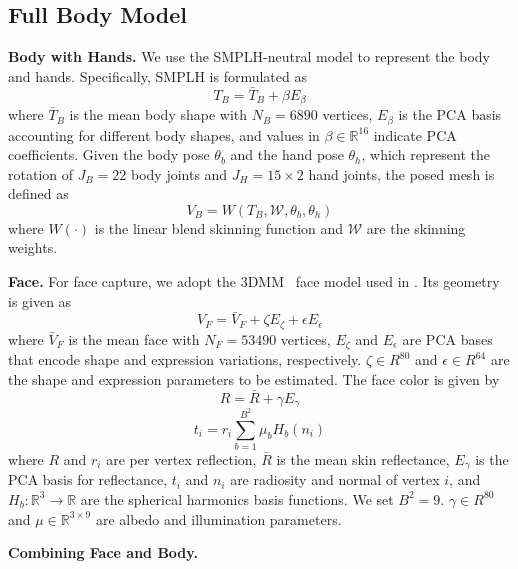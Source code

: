 \documentclass[final]{cvpr}
\begin{document}
\subsection{Full Body Model}
\label{sec:mesh}
\noindent \textbf{Body with Hands.}
We use the SMPLH-neutral \cite{romero2017embodied} model to represent the body and hands.
Specifically, SMPLH is formulated as
\begin{equation}
  T_B = \bar{T}_B + \beta E_\beta
\end{equation}
where $\bar{T}_B$ is the mean body shape with $N_B = 6890$ vertices, $E_\beta$ is the PCA basis accounting for different body shapes, and values in $\beta \in \mathbb{R}^{16}$ indicate PCA coefficients.
Given the body pose $\theta_b$ and the hand pose $\theta_h$, which represent the rotation of $J_B = 22$ body joints and $J_H = 15 \times 2$ hand joints, the posed mesh is defined as
\begin{equation}
  V_B = W(T_B, \mathcal{W}, \theta_b, \theta_{h})
\end{equation}
where $W(\cdot)$ is the linear blend skinning function and $\mathcal{W}$ are the skinning weights.
\par
\noindent \textbf{Face.}
For face capture, we adopt the 3DMM~\cite{blanz1999a} face model used in \cite{tewari2017mofa}.
Its geometry is given as
\begin{equation}
  V_{F} = \bar{V}_{F} + \zeta E_{\zeta} + \epsilon E_{\epsilon}
\end{equation}
where $\bar{V}_{F}$ is the mean face with $N_F = 53490$ vertices, $E_{\zeta}$ and $E_{\epsilon}$ are PCA bases that encode shape and expression variations, respectively.
$\zeta \in R^{80}$ and $\epsilon \in R^{64}$ are the shape and expression parameters to be estimated.
The face color is given by
\begin{equation}
  R = \bar{R} + \gamma E_{\gamma}
\end{equation}
\begin{equation}
  t_i = r_i \sum^{B^2}_{b=1}\mu_bH_b(n_i)
\end{equation}
where $R$ and $r_i$ are per vertex reflection, $\bar{R}$ is the mean skin reflectance, $E_{\gamma}$ is the PCA basis for reflectance, $t_i$ and $n_i$ are radiosity and normal of vertex $i$, and $H_b: \mathbb{R}^3 \to \mathbb{R}$ are the spherical harmonics basis functions.
We set $B^2 = 9$.
$\gamma \in R^{80}$ and $\mu \in \mathbb{R}^{3 \times 9}$ are albedo and illumination parameters.
\par
\noindent \textbf{Combining Face and Body.}
\end{document}
